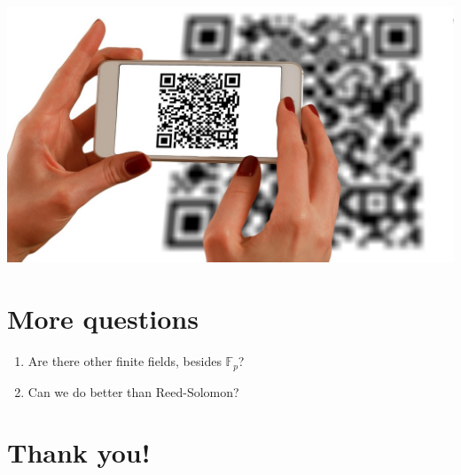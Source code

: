 \documentclass[11pt]{article}
\begin{document}
\begin{center}
\includegraphics[width=.9\linewidth]{qr.jpg}
\end{center}

\section*{More questions}
\label{sec:orge26d810}

\begin{enumerate}
\item Are there other finite fields, besides \(\mathbb F_p\)?
\item Can we do better than Reed-Solomon?
\end{enumerate}

\section*{Thank you!}
\label{sec:org32f9861}
\end{document}
